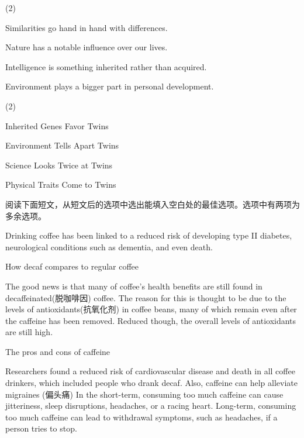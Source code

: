 \documentclass{英语试卷}
\begin{document}
\begin{choices}(2)
  \item Similarities go hand in hand with differences.
  \item Nature has a notable influence over our lives.
  \item Intelligence is something inherited rather than acquired.
  \item Environment plays a bigger part in personal development.
\end{choices}
\begin{choices}(2)
  \item Inherited Genes Favor Twins
  \item Environment Tells Apart Twins
  \item Science Looks Twice at Twins
  \item Physical Traits Come to Twins
\end{choices}
\par 阅读下面短文，从短文后的选项中选出能填入空白处的最佳选项。选项中有两项为多余选项。\par
\par Drinking coffee has been linked to a reduced risk of developing type II diabetes, neurological conditions such as dementia, and even death. \par
\par How decaf compares to regular coffee\par
\par The good news is that many of coffee's health benefits are still found in decaffeinated(脱咖啡因) coffee. The reason for this is thought to be due to the levels of antioxidants(抗氧化剂) in coffee beans, many of which remain even after the caffeine has been removed. Reduced though, the overall levels of antioxidants are still high. \par
\par The pros and cons of caffeine\par
\par Researchers found a reduced risk of cardiovascular disease and death in all coffee drinkers, which included people who drank decaf. Also, caffeine can help alleviate migraines (偏头痛)  In the short-term, consuming too much caffeine can cause jitteriness, sleep disruptions, headaches, or a racing heart. Long-term, consuming too much caffeine can lead to withdrawal symptoms, such as headaches, if a person tries to stop.\par
\end{document}
